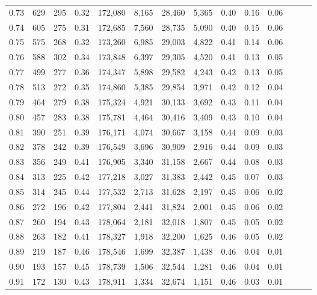 \begin{tabular}{rrrrrrrrrrrrrr}
0.73 &    629 &  295 &  0.32 &  172,080 &    8,165 &  28,460 &   5,365 &  0.40 &  0.16 &      0.06 \\
0.74 &    605 &  275 &  0.31 &  172,685 &    7,560 &  28,735 &   5,090 &  0.40 &  0.15 &      0.06 \\
0.75 &    575 &  268 &  0.32 &  173,260 &    6,985 &  29,003 &   4,822 &  0.41 &  0.14 &      0.06 \\
0.76 &    588 &  302 &  0.34 &  173,848 &    6,397 &  29,305 &   4,520 &  0.41 &  0.13 &      0.05 \\
0.77 &    499 &  277 &  0.36 &  174,347 &    5,898 &  29,582 &   4,243 &  0.42 &  0.13 &      0.05 \\
0.78 &    513 &  272 &  0.35 &  174,860 &    5,385 &  29,854 &   3,971 &  0.42 &  0.12 &      0.04 \\
0.79 &    464 &  279 &  0.38 &  175,324 &    4,921 &  30,133 &   3,692 &  0.43 &  0.11 &      0.04 \\
0.80 &    457 &  283 &  0.38 &  175,781 &    4,464 &  30,416 &   3,409 &  0.43 &  0.10 &      0.04 \\
0.81 &    390 &  251 &  0.39 &  176,171 &    4,074 &  30,667 &   3,158 &  0.44 &  0.09 &      0.03 \\
0.82 &    378 &  242 &  0.39 &  176,549 &    3,696 &  30,909 &   2,916 &  0.44 &  0.09 &      0.03 \\
0.83 &    356 &  249 &  0.41 &  176,905 &    3,340 &  31,158 &   2,667 &  0.44 &  0.08 &      0.03 \\
0.84 &    313 &  225 &  0.42 &  177,218 &    3,027 &  31,383 &   2,442 &  0.45 &  0.07 &      0.03 \\
0.85 &    314 &  245 &  0.44 &  177,532 &    2,713 &  31,628 &   2,197 &  0.45 &  0.06 &      0.02 \\
0.86 &    272 &  196 &  0.42 &  177,804 &    2,441 &  31,824 &   2,001 &  0.45 &  0.06 &      0.02 \\
0.87 &    260 &  194 &  0.43 &  178,064 &    2,181 &  32,018 &   1,807 &  0.45 &  0.05 &      0.02 \\
0.88 &    263 &  182 &  0.41 &  178,327 &    1,918 &  32,200 &   1,625 &  0.46 &  0.05 &      0.02 \\
0.89 &    219 &  187 &  0.46 &  178,546 &    1,699 &  32,387 &   1,438 &  0.46 &  0.04 &      0.01 \\
0.90 &    193 &  157 &  0.45 &  178,739 &    1,506 &  32,544 &   1,281 &  0.46 &  0.04 &      0.01 \\
0.91 &    172 &  130 &  0.43 &  178,911 &    1,334 &  32,674 &   1,151 &  0.46 &  0.03 &      0.01 \\

\end{tabular}
